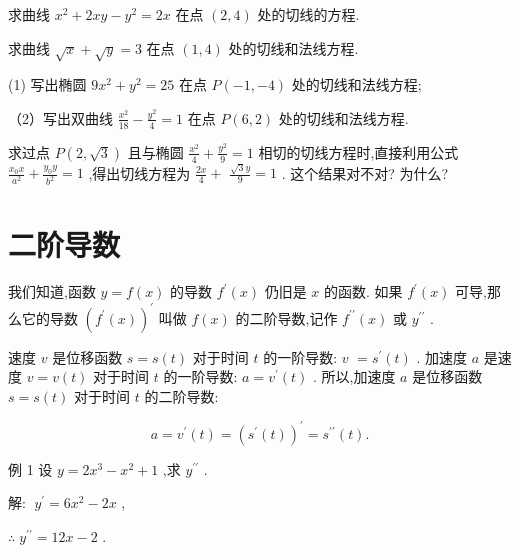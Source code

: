 \documentclass[lang=cn,newtx,10pt,scheme=chinese]{elegantbook}
\begin{document}
\begin{problemset}[练习]

\item 求曲线 \({x}^{2} + {2xy} - {y}^{2} = {2x}\) 在点 \(\left( {2,4}\right)\) 处的切线的方程.

\item 求曲线 \(\sqrt{x} + \sqrt{y} = 3\) 在点 \(\left( {1,4}\right)\) 处的切线和法线方程.

\item (1) 写出椭圆 \(9{x}^{2} + {y}^{2} = {25}\) 在点 \(P\left( {-1, - 4}\right)\) 处的切线和法线方程;

（2）写出双曲线 \(\frac{{x}^{2}}{18} - \frac{{y}^{2}}{4} = 1\) 在点 \(P\left( {6,2}\right)\) 处的切线和法线方程.

\item 求过点 \(P\left( {2,\sqrt{3}}\right)\) 且与椭圆 \(\frac{{x}^{2}}{4} + \frac{{y}^{2}}{9} = 1\) 相切的切线方程时,直接利用公式 \(\frac{{x}_{0}x}{{a}^{2}} + \frac{{y}_{0}y}{{b}^{2}} = 1\) ,得出切线方程为 \(\frac{2x}{4} +\) \(\frac{\sqrt{3}y}{9} = 1\) . 这个结果对不对? 为什么?

\end{problemset}

\section{二阶导数}

我们知道,函数 \(y = f\left( x\right)\) 的导数 \({f}^{\prime }\left( x\right)\) 仍旧是 \(x\) 的函数. 如果 \({f}^{\prime }\left( x\right)\) 可导,那么它的导数 \({\left( {f}^{\prime }\left( x\right) \right) }^{\prime }\) 叫做 \(f\left( x\right)\) 的二阶导数,记作 \({f}^{\prime \prime }\left( x\right)\) 或 \({y}^{\prime \prime }\) .

速度 \(v\) 是位移函数 \(s = s\left( t\right)\) 对于时间 \(t\) 的一阶导数: \(v\) \(= {s}^{\prime }\left( t\right)\) . 加速度 \(a\) 是速度 \(v = v\left( t\right)\) 对于时间 \(t\) 的一阶导数: \(a = {v}^{\prime }\left( t\right)\) . 所以,加速度 \(a\) 是位移函数 \(s = s\left( t\right)\) 对于时间 \(t\) 的二阶导数:

\[
a = {v}^{\prime }\left( t\right) = {\left( {s}^{\prime }\left( t\right) \right) }^{\prime } = {s}^{\prime \prime }\left( t\right) .
\]

例 1 设 \(y = 2{x}^{3} - {x}^{2} + 1\) ,求 \({y}^{\prime \prime }\) .

解: \(\;{y}^{\prime } = 6{x}^{2} - {2x}\) ,

\(\therefore \;{y}^{\prime \prime } = {12x} - 2\) .
\end{document}
